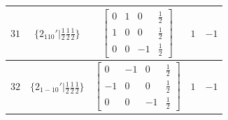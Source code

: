 \documentclass[fleqn,8pt]{jsarticle}
\begin{document}
\begin{longtable}{ccccc}
$ 31 $ & $ \{2{}_{110}{}'|\frac{1}{2} \frac{1}{2} \frac{1}{2}\} $ & $ \begin{bmatrix} 0 & 1 & 0 & \frac{1}{2} \\ 1 & 0 & 0 & \frac{1}{2} \\ 0 & 0 & -1 & \frac{1}{2} \end{bmatrix} $ & $ 1 $ & $ -1 $ \\ \hline
$ 32 $ & $ \{2{}_{1-10}{}'|\frac{1}{2} \frac{1}{2} \frac{1}{2}\} $ & $ \begin{bmatrix} 0 & -1 & 0 & \frac{1}{2} \\ -1 & 0 & 0 & \frac{1}{2} \\ 0 & 0 & -1 & \frac{1}{2} \end{bmatrix} $ & $ 1 $ & $ -1 $ \\
\end{longtable}
\end{document}
